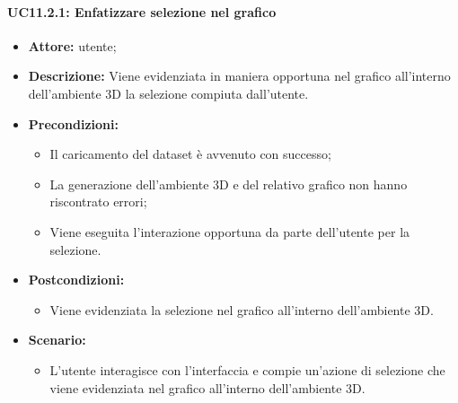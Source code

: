 \paragraph{UC11.2.1: Enfatizzare selezione nel grafico}
\begin{itemize}    
    \item \textbf{Attore:} utente;
    \item \textbf{Descrizione:} Viene evidenziata in maniera opportuna nel grafico all'interno dell'ambiente 3D la selezione compiuta dall'utente.
    \item \textbf{Precondizioni:}    
        \begin{itemize}
            \item Il caricamento del dataset è avvenuto con successo;
            \item La generazione dell'ambiente 3D e del relativo grafico non hanno riscontrato errori;
            \item Viene eseguita l'interazione opportuna da parte dell'utente per la selezione.
        \end{itemize}    
    \item \textbf{Postcondizioni:}
        \begin{itemize}
            \item Viene evidenziata la selezione nel grafico all'interno dell'ambiente 3D.
        \end{itemize}    
    \item \textbf{Scenario:} 
        \begin{itemize}
            \item L'utente interagisce con l'interfaccia e compie un'azione di selezione che viene evidenziata nel grafico all'interno dell'ambiente 3D.
        \end{itemize}
\end{itemize}

